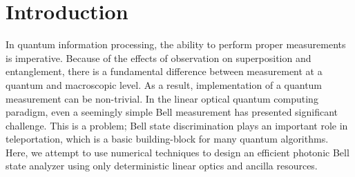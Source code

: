 \documentclass[aps,pra,twocolumn,showpacs,superscriptaddress,floatfix,10pt]{revtex4}
\begin{document}
\section{Introduction}
\label{Intro}
In quantum information processing, the ability to perform proper measurements is imperative. Because of the effects of observation on superposition and entanglement, there is a fundamental difference between measurement at a quantum and macroscopic level. As a result, implementation of a quantum measurement can be non-trivial. In the linear optical quantum computing paradigm, even a seemingly simple Bell measurement has presented significant challenge. This is a problem; Bell state discrimination plays an important role in teleportation, which is a basic building-block for many quantum algorithms. Here, we attempt to use numerical techniques to design an efficient photonic Bell state analyzer using only deterministic linear optics and ancilla resources. 
\end{document}
